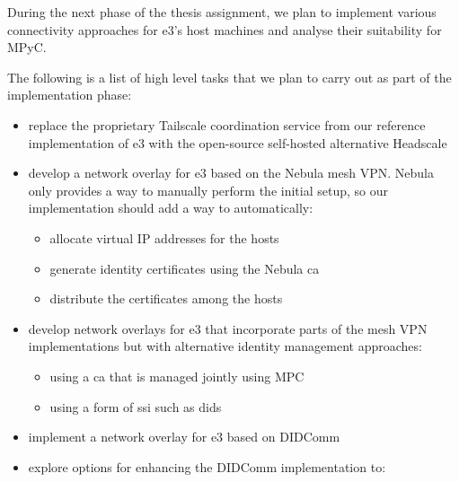 \documentclass[
]{article}
\providecommand{\tightlist}{%
  \setlength{\itemsep}{0pt}\setlength{\parskip}{0pt}}
\begin{document}
During the next phase of the thesis assignment, we plan to implement
various connectivity approaches for \gls{e3}'s host machines and analyse
their suitability for MPyC.

The following is a list of high level tasks that we plan to carry out as
part of the implementation phase:

\begin{itemize}
  \item
        replace the proprietary Tailscale coordination service from our
        reference implementation of \gls{e3} with the open-source self-hosted
        alternative Headscale\autocite{fontJuanfontHeadscale2022}
  \item
        develop a network overlay for \gls{e3} based on the Nebula mesh VPN.
        Nebula only provides a way to manually perform the initial setup, so
        our implementation should add a way to automatically:

        \begin{itemize}
          \tightlist
          \item
                allocate virtual IP addresses for the hosts
          \item
                generate identity certificates using the Nebula \gls{ca}
          \item
                distribute the certificates among the hosts
        \end{itemize}
  \item
        develop network overlays for \gls{e3} that incorporate parts of the
        mesh VPN implementations but with alternative identity management
        approaches:

        \begin{itemize}
          \tightlist
          \item
                using a \gls{ca} that is managed jointly using MPC
          \item
                using a form of \gls{ssi} such as \glspl{did}
        \end{itemize}
  \item
        implement a network overlay for \gls{e3} based on DIDComm
  \item
        explore options for enhancing the DIDComm implementation to:


\end{itemize}
\end{document}
